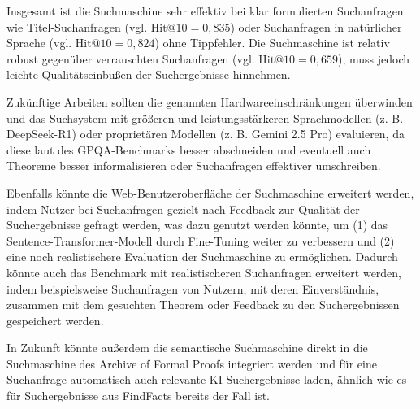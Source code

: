\documentclass[12pt,letterpaper]{article} %
\begin{document}
Insgesamt ist die Suchmaschine sehr effektiv bei klar formulierten Suchanfragen wie Titel-Suchanfragen (vgl. $\text{Hit@10}=0,835$) oder Suchanfragen in natürlicher Sprache (vgl. $\text{Hit@10}=0,824$) ohne Tippfehler.
Die Suchmaschine ist relativ robust gegenüber verrauschten Suchanfragen (vgl. $\text{Hit@10}=0,659$), muss jedoch leichte Qualitätseinbußen der Suchergebnisse hinnehmen.

Zukünftige Arbeiten sollten die genannten Hardwareeinschränkungen überwinden und das Suchsystem mit größeren und leistungsstärkeren Sprachmodellen (z. B. DeepSeek-R1) oder proprietären Modellen (z. B. Gemini 2.5 Pro) evaluieren, da diese laut des GPQA-Benchmarks besser abschneiden und eventuell auch Theoreme besser informalisieren oder Suchanfragen effektiver umschreiben.

Ebenfalls könnte die Web-Benutzeroberfläche der Suchmaschine erweitert werden, indem Nutzer bei Suchanfragen gezielt nach Feedback zur Qualität der Suchergebnisse gefragt werden, was dazu genutzt werden könnte, um (1) das Sentence-Transformer-Modell durch Fine-Tuning weiter zu verbessern und (2) eine noch realistischere Evaluation der Suchmaschine zu ermöglichen.
Dadurch könnte auch das Benchmark mit realistischeren Suchanfragen erweitert werden, indem beispielsweise Suchanfragen von Nutzern, mit deren Einverständnis, zusammen mit dem gesuchten Theorem oder Feedback zu den Suchergebnissen gespeichert werden.

In Zukunft könnte außerdem die semantische Suchmaschine direkt in die Suchmaschine des Archive of Formal Proofs integriert werden und für eine Suchanfrage automatisch auch relevante KI-Suchergebnisse laden, ähnlich wie es für Suchergebnisse aus FindFacts bereits der Fall ist.


\pagebreak



\pagebreak

\listoffigures{}
\listoftables{}

\clearpage
\printglossaries

\pagebreak

{}
{}
\pagestyle{fancy}


\nocite{*} %

\end{document}
